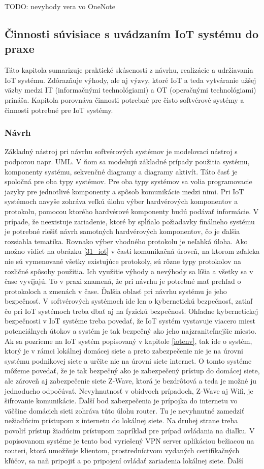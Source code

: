 TODO: nevyhody vera vo OneNote

\subsection{Činnosti súvisiace s uvádzaním IoT systému do praxe}
Táto kapitola sumarizuje praktické skúsenosti z návrhu, realizácie a udržiavania IoT systému. Zdôrazňuje výhody, ale aj výzvy, ktoré  IoT a teda vytváranie užšej väzby medzi IT (informačnými technológiami) a OT (operačnými technológiami) prináša. Kapitola porovnáva činnosti potrebné pre čisto softvérové systémy a činnosti potrebné pre IoT systémy. 
\subsubsection{Návrh}
Základný nástroj pri návrhu softvérových systémov je modelovací nástroj s podporou napr. UML. V ňom sa modelujú základné prípady použitia systému, komponenty systému, sekvenčné diagramy a diagramy aktivít. Táto časť je spoločná pre oba typy systémov. Pre oba typy systémov sa volia programovacie jazyky pre jednotlivé komponenty a spôsob komunikácie medzi nimi. Pri IoT systémoch navyše zohráva veľkú úlohu výber hardvérových komponentov a protokolu, pomocou ktorého hardvérové komponenty budú podávať informácie. V prípade, že neexistuje zariadenie, ktoré by spĺňalo požiadavky finálneho systému je potrebné riešiť návrh samotných hardvérových komponentov, čo je ďalšia rozsiahla tematika. Rovnako výber vhodného protokolu je neľahká úloha. Ako možno vidieť na obrázku \ref{31_iot} v časti komunikačná úroveň, na ktorom zďaleka nie sú vymenované všetky existujúce protokoly, sú rôzne typy protokolov na rozličné spôsoby použitia. Ich využitie výhody a nevýhody sa líšia a všetky sa v čase vyvíjajú. To v praxi znamená, že pri návrhu je potrebné mať prehľad o protokoloch a zmenách v čase. Ďalšia oblasť pri návrhu systému je jeho bezpečnosť. V softvérových systémoch ide len o kybernetickú bezpečnosť, zatiaľ čo pri IoT systémoch treba dbať aj na fyzickú bezpečnosť. Ohľadne kybernetickej bezpečnosti v IoT systéme treba povedať, že IoT systém vystavuje viacero miest potenciálnych útokov a systém je tak bezpečný ako jeho najzraniteľnejšie miesto. Ak sa pozrieme na IoT systém popisovaný v kapitole \ref{iotenv}, tak ide o systém, ktorý je v rámci lokálnej domácej siete a preto zabezpečenie nie je na úrovni systému podnikovej siete a určite nie na úrovni siete internet.  O tomto systéme môžeme povedať, že je tak bezpečný ako je zabezpečený prístup do domácej siete, ale zároveň aj zabezpečenie siete Z-Wave, ktorá je bezdrôtová a teda je možné ju jednoducho odpočúvať. Nevyhnutnosť v obidvoch prípadoch, Z-Wave aj Wifi, je šifrovanie komunikácie. Ďalší bod zabezpečenia je prípojka do internetu vo väčšine domácich sieti zohráva túto úlohu router. Tu je nevyhnutné zamedziť nežiadúcim prístupom z internetu do lokálnej siete. Na druhej strane treba povoliť prístup žiadúcim prístupom napríklad pre prípad ovládania na diaľku. V popisovanom systéme je tento bod vyriešený VPN server aplikáciou bežiacou na routeri, ktorá umožňuje klientom, prostredníctvom vydaných certifikačných kľúčov, sa naň pripojiť a po pripojení ovládať zariadenia lokálnej siete. Ďalší 